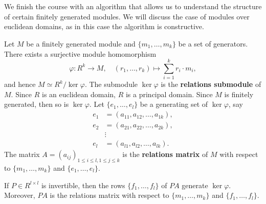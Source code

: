 \chapter{}


We finish the course with an algorithm that allows us to understand the
structure of certain finitely generated modules.  We will discuss the case of
modules over euclidean domains, as in this case the algorithm is constructive. 


Let $M$ be a finitely generated module and $\{m_1,\dots,m_k\}$ be a set of
generators.  There exists a surjective module homomorphism 
\[
	\varphi\colon R^k\to M, 
	\quad
	(r_1,\dots,r_k)\mapsto \sum_{i=1}^k r_i\cdot m_i,
\]
and hence 
$M\simeq R^k/\ker\varphi$. 
The submodule $\ker\varphi$ is the \textbf{relations submodule} of $M$. 
Since $R$ is an euclidean domain, $R$ is a principal domain. Since 
$M$ is finitely generated, then so is $\ker\varphi$. Let 
$\{e_1,\dots,e_l\}$ be a generating set of $\ker\varphi$, say 
\begin{align*}
e_1&=(a_{11},a_{12},\dots,a_{1k}),\\
e_2&=(a_{21},a_{22},\dots,a_{2k}),\\
&\vdots\\
e_l&=(a_{l1},a_{l2},\dots,a_{lk}).	
\end{align*}
The matrix $A=(a_{ij})_{1\leq i\leq l,1\leq j\leq k}$ is the 
\textbf{relations matrix} of $M$ with respect to $\{m_1,\dots,m_k\}$ 
and $\{e_1,\dots,e_l\}$. 

\begin{claim}
		If $P\in R^{l\times l}$ is invertible, then the rows
		$\{f_1,\dots,f_l\}$ of $PA$ generate $\ker\varphi$. Moreover, $PA$ is
		the relations matrix with respect to $\{m_1,\dots,m_k\}$ and
		$\{f_1,\dots,f_l\}$. 
\end{claim}



